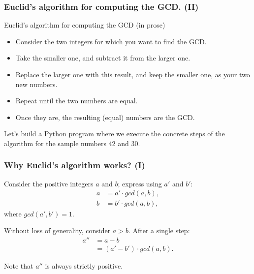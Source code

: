 \documentclass{beamer} %
\begin{document}
\begin{frame}
\frametitle{Euclid's algorithm for computing the GCD. (II)} 

\begin{block}{Euclid's algorithm for computing the GCD (in prose)}
\begin{itemize}
\item Consider the two integers for which you want to find the GCD.
\item Take the smaller one, and subtract it from the larger one. 
\item Replace the larger one with this result, and keep the smaller one, as your two new numbers. 
\item Repeat until the two numbers are equal. 
\item Once they are, the resulting (equal) numbers are the GCD.  
\end{itemize}
\end{block}

Let's build a Python program where we execute the concrete steps of the algorithm for the sample numbers 42 and 30.

\end{frame}

\begin{frame}
\frametitle{Why Euclid's algorithm works? (I)}

Consider the positive integers $a$ and $b$; express using $a'$ and $b'$:
\begin{align}
a &= a' \cdot gcd(a,b), \\
b &= b' \cdot gcd(a,b),
\end{align}
where $gcd(a',b') = 1.$

Without loss of generality, consider $a > b$. After a single step:
\begin{align}
a'' &= a - b \\ 
    &= (a' - b') \cdot gcd(a,b).
\end{align}

Note that $a''$ is always strictly positive.

\end{frame}
\end{document}

